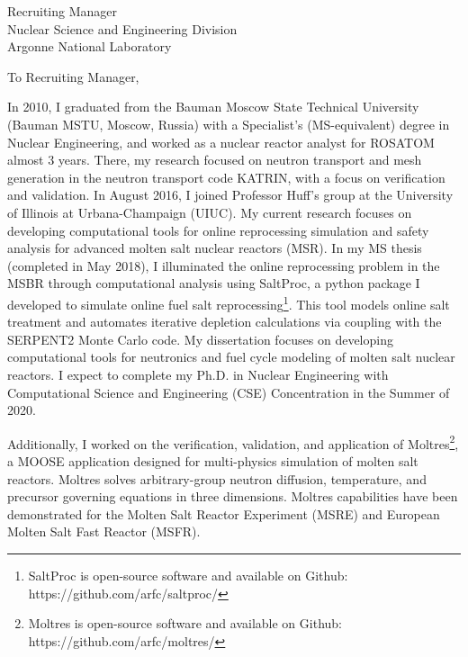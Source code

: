 \documentclass[11pt]{letter} %
\newcommand{\RecipientName}{Recruiting Manager\xspace}
\newcommand{\RecipientAddress}{Nuclear Science and Engineering Division \\
Argonne National Laboratory}
\begin{document}
\begin{letter}{\RecipientName\\
        \RecipientAddress\xspace}

\address{Andrei Rykhlevskii\\
andreir2@illinois.edu\\
226 Talbot Laboratory\\
104 Wright Street\\
Urbana, IL 61801}


\opening{To \RecipientName,}

In 2010, I graduated from the Bauman Moscow State Technical University (Bauman 
MSTU, Moscow, Russia) with a Specialist’s (MS-equivalent) degree in Nuclear 
Engineering, and worked as a nuclear reactor analyst for ROSATOM almost 3 
years. There, my research focused on neutron transport and mesh generation in 
the neutron transport code KATRIN, with a focus on verification and 
validation. In August 2016, I joined Professor Huff’s group at the University 
of Illinois at Urbana-Champaign (UIUC). My current research focuses on 
developing computational tools for online reprocessing simulation and safety 
analysis for advanced molten salt nuclear reactors (MSR). In my MS thesis 
(completed in May 2018), I illuminated the online reprocessing problem in the 
MSBR through computational analysis using SaltProc, a python package I 
developed to simulate online fuel salt reprocessing\footnote{SaltProc is 
open-source software and available on Github: 
https://github.com/arfc/saltproc/}. This tool models online salt treatment and 
automates iterative depletion calculations via coupling with the SERPENT2 
Monte Carlo code. My dissertation focuses on developing computational tools 
for neutronics and fuel cycle modeling of molten salt nuclear reactors. I 
expect to complete my Ph.D. in Nuclear Engineering with Computational Science 
and Engineering (CSE) Concentration in the Summer of 2020.

Additionally, I worked on the verification, validation, and application of 
Moltres\footnote{Moltres is open-source software and available on Github: 
https://github.com/arfc/moltres/}, a MOOSE application designed for 
multi-physics simulation of molten salt reactors. Moltres solves 
arbitrary-group neutron diffusion, temperature, and precursor governing 
equations in three dimensions. Moltres capabilities have been demonstrated for 
the Molten Salt Reactor Experiment (MSRE) and European Molten Salt Fast 
Reactor (MSFR).


\end{letter}
\end{document}
